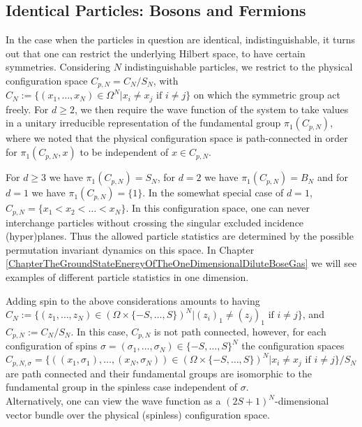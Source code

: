 	\subsection{Identical Particles: Bosons and Fermions}
		In the case when the particles in question are identical, \ie indistinguishable, it turns out that one can restrict the underlying Hilbert space, to have certain symmetries. Considering $ N $ indistinguishable particles, we restrict to the physical configuration space $ C_{p,N}=C_N/S_N $, with $ C_N:=\{(x_1,\ldots,x_N)\in \Omega^N \vert x_i\neq x_j \text{ if }i\neq j\} $ on which the symmetric group act freely. For $ d\geq 2 $, we then require the wave function of the system to take values in a unitary irreducible representation of the fundamental group $\pi_1(C_{p,N})$, where we noted that the physical configuration space is path-connected in order for $ \pi_1(C_{p,N},x) $ to be independent of $ x\in C_{p,N} $.
		\begin{remark}
			For $ d\geq 3 $ we have $\pi_1(C_{p,N})=S_N$, for $ d=2 $ we have $\pi_1(C_{p,N})=B_N$ and for $d=1$ we have $\pi_1(C_{p,N})=\{1\}$. In the somewhat special case of $d=1$, $C_{p,N}=\{x_1<x_2<\ldots<x_N\}$. In this configuration space, one can never interchange particles without crossing the singular excluded incidence (hyper)planes. Thus the allowed particle statistics are determined by the possible permutation invariant dynamics on this space. In Chapter \ref{ChapterTheGroundStateEnergyOfTheOneDimensionalDiluteBoseGas} we will see examples of different particle statistics in one dimension. 
		\end{remark}
		\begin{remark}
			Adding spin to the above considerations amounts to having $C_N:=\{(z_1,\ldots,z_N)\in \left(\Omega\times\{-S,\ldots,S\}\right)^N \vert (z_i)_1\neq (z_j)_1 \text{ if }i\neq j\}$, and $C_{p,N}:=C_N/S_N$. In this case, $C_{p,N}$ is not path connected, however, for each configuration of spins $ \sigma=(\sigma_1,\ldots,\sigma_N)\in\{-S,\ldots,S\}^N $ the configuration spaces $ C_{p,N,\sigma}=\{((x_1,\sigma_1),\ldots,(x_N,\sigma_N))\in \left(\Omega\times\{-S,\ldots,S\}\right)^N \vert x_i\neq x_j \text{ if }i\neq j\}/S_N $ are path connected and their fundamental groups are isomorphic to the fundamental group in the spinless case independent of $ \sigma $.\\
			Alternatively, one can view the wave function as a $ (2S+1)^N $-dimensional vector bundle over the physical (spinless) configuration space.
		\end{remark}
